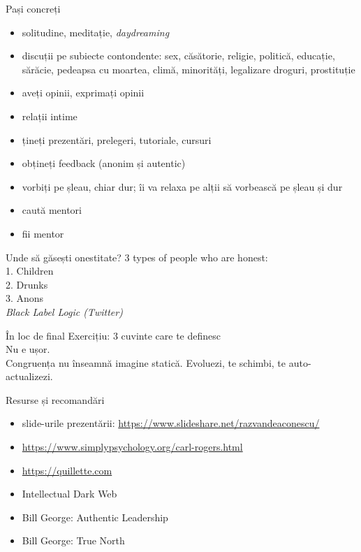 \documentclass{simple}
\begin{document}
\begin{frame}{Pași concreți}
  \begin{itemize}
    \pause
    \item solitudine, meditație, \textit{daydreaming}
    \pause
    \item discuții pe subiecte contondente: sex, căsătorie, religie, politică, educație, sărăcie, pedeapsa cu moartea, climă, minorități, legalizare droguri, prostituție
    \pause
    \item aveți opinii, exprimați opinii
    \pause
    \item relații intime
    \pause
    \item țineți prezentări, prelegeri, tutoriale, cursuri
    \pause
    \item obțineți feedback (anonim și autentic)
    \pause
    \item vorbiți pe șleau, chiar dur; îi va relaxa pe alții să vorbească pe șleau și dur
    \pause
    \item caută mentori
    \pause
    \item fii mentor
  \end{itemize}
\end{frame}

\begin{frame}{Unde să găsești onestitate?}
3 types of people who are honest:\\
1. Children\\
2. Drunks\\
3. Anons\\
  \hfill{\textit{Black Label Logic (Twitter)}}
\end{frame}

\begin{frame}{În loc de final}
  \centering
  \pause
  \Large{Exercițiu: 3 cuvinte care te definesc} \\
  \pause
  \Large{Nu e ușor.} \\
  \pause
  \Large{Congruența nu înseamnă imagine statică. Evoluezi, te schimbi, te auto-actualizezi.}
\end{frame}

\begin{frame}{Resurse și recomandări}
  \begin{itemize}
    \item slide-urile prezentării: \url{https://www.slideshare.net/razvandeaconescu/}
    \item \url{https://www.simplypsychology.org/carl-rogers.html}
    \item \url{https://quillette.com}
    \item Intellectual Dark Web
    \item Bill George: Authentic Leadership
    \item Bill George: True North
  \end{itemize}
\end{frame}
\end{document}
